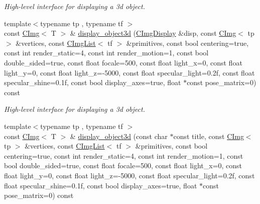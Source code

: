 \begin{DoxyCompactItemize}
\begin{DoxyCompactList}\small\item\em High-\/level interface for displaying a 3d object. \item\end{DoxyCompactList}\item 
\hypertarget{structcimg__library_1_1CImg_adc54baed0d0f9fedf46c2574c04ad8a0}{
{\footnotesize template$<$typename tp , typename tf $>$ }\\const \hyperlink{structcimg__library_1_1CImg}{CImg}$<$ T $>$ \& \hyperlink{structcimg__library_1_1CImg_adc54baed0d0f9fedf46c2574c04ad8a0}{display\_\-object3d} (\hyperlink{structcimg__library_1_1CImgDisplay}{CImgDisplay} \&disp, const \hyperlink{structcimg__library_1_1CImg}{CImg}$<$ tp $>$ \&vertices, const \hyperlink{structcimg__library_1_1CImgList}{CImgList}$<$ tf $>$ \&primitives, const bool centering=true, const int render\_\-static=4, const int render\_\-motion=1, const bool double\_\-sided=true, const float focale=500, const float light\_\-x=0, const float light\_\-y=0, const float light\_\-z=-\/5000, const float specular\_\-light=0.2f, const float specular\_\-shine=0.1f, const bool display\_\-axes=true, float $\ast$const pose\_\-matrix=0) const }
\label{structcimg__library_1_1CImg_adc54baed0d0f9fedf46c2574c04ad8a0}

\begin{DoxyCompactList}\small\item\em High-\/level interface for displaying a 3d object. \item\end{DoxyCompactList}\item 
\hypertarget{structcimg__library_1_1CImg_a69546aee0db1c479f55d498466e758c2}{
{\footnotesize template$<$typename tp , typename tf $>$ }\\const \hyperlink{structcimg__library_1_1CImg}{CImg}$<$ T $>$ \& \hyperlink{structcimg__library_1_1CImg_a69546aee0db1c479f55d498466e758c2}{display\_\-object3d} (const char $\ast$const title, const \hyperlink{structcimg__library_1_1CImg}{CImg}$<$ tp $>$ \&vertices, const \hyperlink{structcimg__library_1_1CImgList}{CImgList}$<$ tf $>$ \&primitives, const bool centering=true, const int render\_\-static=4, const int render\_\-motion=1, const bool double\_\-sided=true, const float focale=500, const float light\_\-x=0, const float light\_\-y=0, const float light\_\-z=-\/5000, const float specular\_\-light=0.2f, const float specular\_\-shine=0.1f, const bool display\_\-axes=true, float $\ast$const pose\_\-matrix=0) const }
\label{structcimg__library_1_1CImg_a69546aee0db1c479f55d498466e758c2}


\end{DoxyCompactItemize}
